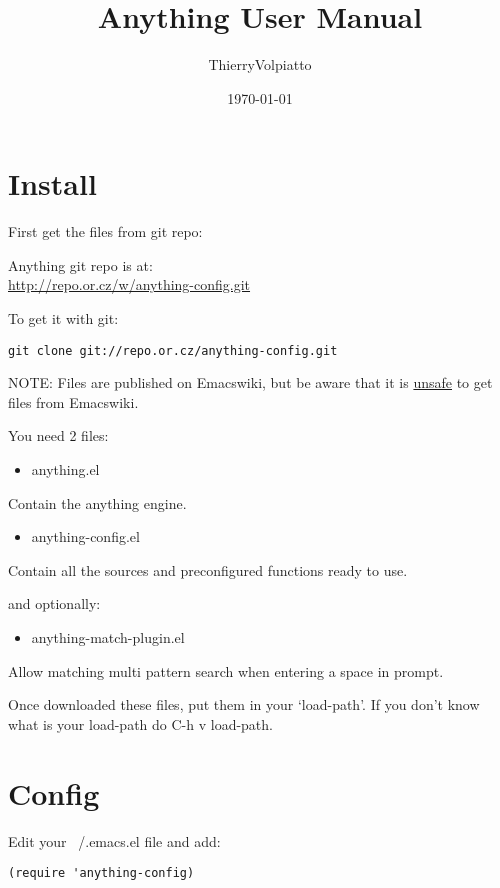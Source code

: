 \documentclass[a4paper,11pt]{article}
\begin{document}
\begin{titlepage}
\title{Anything User Manual}
\date{\today}
\author{ThierryVolpiatto}
\maketitle
\tableofcontents
\end{titlepage}

\section{Install}
\label{sec:install}

First get the files from git repo:

Anything git repo is at:\\
\url{http://repo.or.cz/w/anything-config.git}

To get it with git:

\begin{verbatim}
git clone git://repo.or.cz/anything-config.git
\end{verbatim}

NOTE: Files are published on Emacswiki, but be aware that it is \underline{unsafe} to get files from Emacswiki.
          
You need 2 files:
\begin{itemize}
\item anything.el
\end{itemize}
Contain the anything engine.

\begin{itemize}
\item anything-config.el
\end{itemize}
Contain all the sources and preconfigured functions ready to use.

and optionally:
\begin{itemize}
\item anything-match-plugin.el
\end{itemize}
Allow matching multi pattern search when entering a space in prompt.

Once downloaded these files, put them in your `load-path'.
If you don't know what is your load-path do C-h v load-path.

\section{Config}
\label{sec:config}
Edit your ~/.emacs.el file and add:

\begin{verbatim}
(require 'anything-config)
\end{verbatim}
\end{document}

